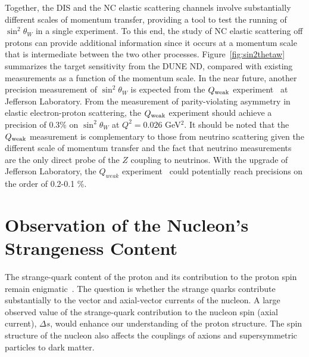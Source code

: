 Together, the DIS and the NC elastic scattering channels involve
substantially different scales of momentum transfer, providing a tool
to test the running of $\sin^2 \theta_W$ in a single experiment. To
this end, the study of NC elastic scattering off protons can provide
additional information since it occurs at a momentum scale that is
intermediate between the two other processes.
Figure~\ref{fig:sin2thetaw} summarizes the target sensitivity from the
DUNE ND, compared with existing measurements as a function of the
momentum scale.
In the near future, another precision measurement of $\sin^2 \theta_W$
is expected from the $Q_{\rm weak}$ experiment~\cite{Lee:2013kya}
at Jefferson Laboratory. From the
measurement of parity-violating asymmetry in elastic electron-proton
scattering, the $Q_{\rm weak}$ experiment should achieve a precision
of 0.3\% on $\sin^2 \theta_W$ at $Q^2=0.026$ GeV$^2$.  It should be
noted that the $Q_{\rm weak}$ measurement is complementary to those
from neutrino scattering given the different scale of momentum
transfer and the fact that neutrino measurements are the only direct
probe of the $Z$ coupling to neutrinos. With the  upgrade
of Jefferson Laboratory, the $Q_{weak}$ experiment~\cite{Nuruzzaman:2013bwa} could
potentially reach precisions on the order of 0.2-0.1 \%.
\section{Observation of the Nucleon's Strangeness Content}
\label{sec-deltas} 

  The strange-quark content of the proton and its contribution to the
  proton spin remain enigmatic~\cite{Jaffe:1989jz}.  The question is whether the strange
  quarks contribute substantially to the vector and axial-vector
  currents of the nucleon.  A large observed value of the
  strange-quark contribution to the nucleon spin (axial current),
  $\Delta s$, would enhance our understanding of the proton structure.
The spin structure of the nucleon also affects the couplings of axions and
supersymmetric particles to dark matter. 

